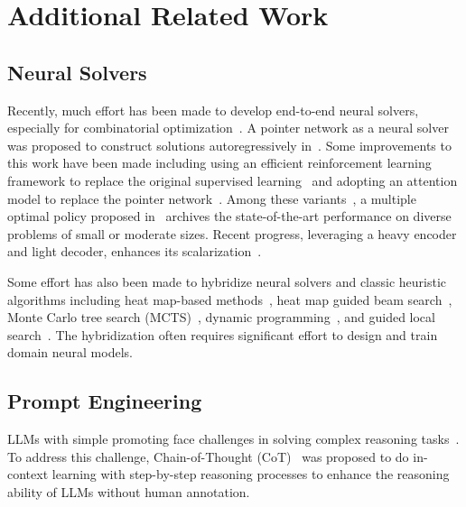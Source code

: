 \newpage
\appendix
\onecolumn


\section{Additional Related Work}

\subsection{Neural Solvers}
Recently, much effort has been made to develop end-to-end neural solvers, especially for combinatorial optimization~\cite{bengio2021machine}. A pointer network as a neural solver was proposed to construct solutions autoregressively in~\citet{vinyals2015pointer}. Some improvements to this work have been made including using an efficient reinforcement learning framework to replace the original supervised learning~\cite{bello2016neural} and adopting an attention model to replace the pointer network~\cite{kool2018attention,deudon2018learning}. Among these variants~\cite{xin2020step,kwon2020pomo,kwon2021matrix}, a multiple optimal policy proposed in~\cite{kwon2020pomo} archives the state-of-the-art performance on diverse problems of small or moderate sizes. Recent progress, leveraging a heavy encoder and light decoder, enhances its scalarization~\cite{drakulic2023bq,luo2023neural}.

 
Some effort has also been made to hybridize neural solvers and classic heuristic algorithms including heat map-based methods~\cite{joshi2019efficient,fu2021generalize, qiu2022DIMES}, heat map guided beam search~\citep{joshi2019efficient}, Monte Carlo tree search (MCTS)~\cite{fu2021generalize}, dynamic programming~\cite{kool2022deep}, and guided local search~\cite{hudson2021graph,sui2023neuralgls}. 
The hybridization often requires significant effort to design and train domain neural models.



\subsection{Prompt Engineering}
LLMs with simple promoting face challenges in solving complex reasoning tasks~\cite{chu2023survey}. To address this challenge, Chain-of-Thought (CoT)~\cite{wei2022chain} was proposed to do in-context learning with step-by-step reasoning processes to enhance the reasoning ability of LLMs without human annotation. 

